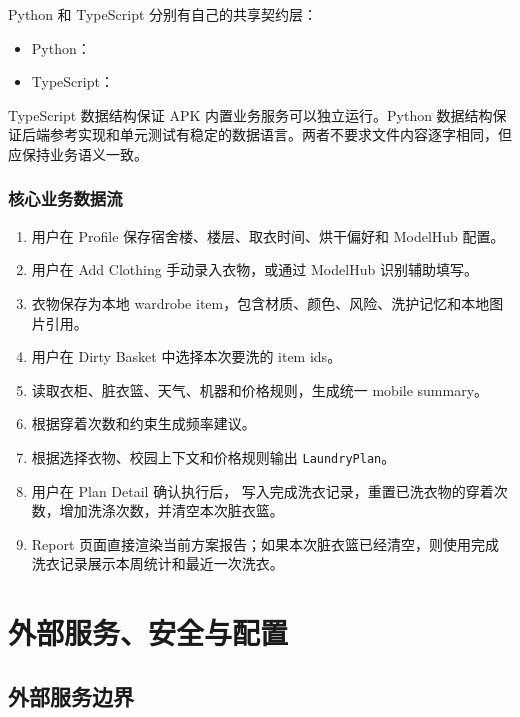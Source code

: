 \documentclass[11pt,a4paper]{ctexart}
\begin{document}
Python 和 TypeScript 分别有自己的共享契约层：

\begin{itemize}
  \item Python：
  \item TypeScript：
\end{itemize}

TypeScript 数据结构保证 APK 内置业务服务可以独立运行。Python 数据结构保证后端参考实现和单元测试有稳定的数据语言。两者不要求文件内容逐字相同，但应保持业务语义一致。

\subsubsection{核心业务数据流}

\begin{enumerate}
  \item 用户在 Profile 保存宿舍楼、楼层、取衣时间、烘干偏好和 ModelHub 配置。
  \item 用户在 Add Clothing 手动录入衣物，或通过 ModelHub 识别辅助填写。
  \item 衣物保存为本地 wardrobe item，包含材质、颜色、风险、洗护记忆和本地图片引用。
  \item 用户在 Dirty Basket 中选择本次要洗的 item ids。
  \item {} 读取衣柜、脏衣篮、天气、机器和价格规则，生成统一 mobile summary。
  \item {} 根据穿着次数和约束生成频率建议。
  \item {} 根据选择衣物、校园上下文和价格规则输出 \texttt{LaundryPlan}。
  \item 用户在 Plan Detail 确认执行后， 写入完成洗衣记录，重置已洗衣物的穿着次数，增加洗涤次数，并清空本次脏衣篮。
  \item Report 页面直接渲染当前方案报告；如果本次脏衣篮已经清空，则使用完成洗衣记录展示本周统计和最近一次洗衣。
\end{enumerate}

\section{外部服务、安全与配置}

\subsection{外部服务边界}
\end{document}
